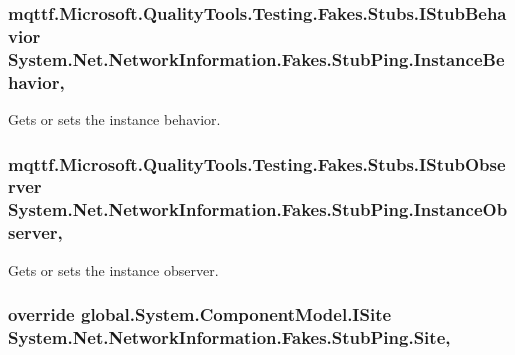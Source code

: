 \hypertarget{class_system_1_1_net_1_1_network_information_1_1_fakes_1_1_stub_ping_a6d2feba66e8e2886b232a037fc3ff62c}{
\subsubsection[{Instance\-Behavior}]{\setlength{\rightskip}{0pt plus 5cm}mqttf.\-Microsoft.\-Quality\-Tools.\-Testing.\-Fakes.\-Stubs.\-I\-Stub\-Behavior System.\-Net.\-Network\-Information.\-Fakes.\-Stub\-Ping.\-Instance\-Behavior\hspace{0.3cm}{\ttfamily [get]}, {\ttfamily [set]}}}\label{class_system_1_1_net_1_1_network_information_1_1_fakes_1_1_stub_ping_a6d2feba66e8e2886b232a037fc3ff62c}


Gets or sets the instance behavior.

\hypertarget{class_system_1_1_net_1_1_network_information_1_1_fakes_1_1_stub_ping_aedfb378a50c13cbb0b54187abbdfc619}{
\subsubsection[{Instance\-Observer}]{\setlength{\rightskip}{0pt plus 5cm}mqttf.\-Microsoft.\-Quality\-Tools.\-Testing.\-Fakes.\-Stubs.\-I\-Stub\-Observer System.\-Net.\-Network\-Information.\-Fakes.\-Stub\-Ping.\-Instance\-Observer\hspace{0.3cm}{\ttfamily [get]}, {\ttfamily [set]}}}\label{class_system_1_1_net_1_1_network_information_1_1_fakes_1_1_stub_ping_aedfb378a50c13cbb0b54187abbdfc619}


Gets or sets the instance observer.

\hypertarget{class_system_1_1_net_1_1_network_information_1_1_fakes_1_1_stub_ping_a25a8ee384829cd05d6f968cf8e7a5c86}{
\subsubsection[{Site}]{\setlength{\rightskip}{0pt plus 5cm}override global.\-System.\-Component\-Model.\-I\-Site System.\-Net.\-Network\-Information.\-Fakes.\-Stub\-Ping.\-Site\hspace{0.3cm}{\ttfamily [get]}, {\ttfamily [set]}}}\label{class_system_1_1_net_1_1_network_information_1_1_fakes_1_1_stub_ping_a25a8ee384829cd05d6f968cf8e7a5c86}


